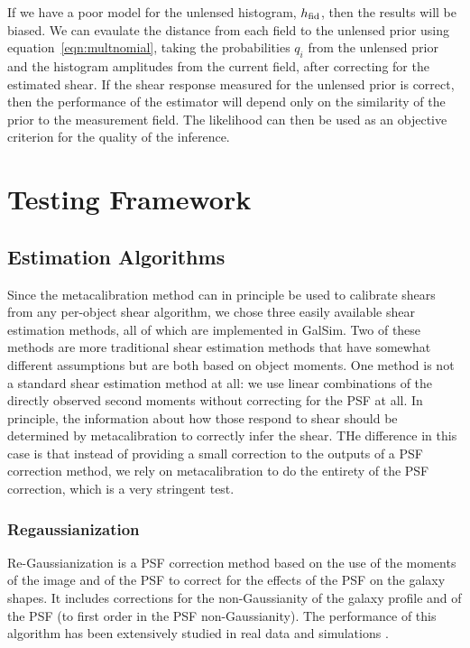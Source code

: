 \documentclass[iop]{emulateapj}
\begin{document}
If we have a poor model for the unlensed histogram, $h_{\rm fid}$, then the results will be biased. We can evaulate the distance from each field to the unlensed prior using equation~\ref{eqn:multnomial}, taking the probabilities $q_i$ from the unlensed prior and the histogram amplitudes from the current field, {after correcting for the estimated shear}. If the shear response measured for the unlensed prior is correct, then the performance of the estimator will depend only on the similarity of the prior to the measurement field. The likelihood can then be used as an objective criterion for the quality of the inference. 



\section{Testing Framework}

\subsection{Estimation Algorithms}

Since the metacalibration method can in principle be used to calibrate shears from any per-object
shear algorithm, we chose three easily available shear estimation methods, all of which are
implemented in GalSim.  Two of these methods are more traditional shear estimation methods that have
somewhat different assumptions but are both based on object moments.  One method is not a standard
shear estimation method at all: we use linear combinations of the directly observed second moments
without correcting for the PSF at all.  In principle, the information about how those respond to
shear should be determined by metacalibration to correctly infer the shear.  THe difference in this
case is that instead of providing a small correction to the outputs of a PSF correction method, we
rely on metacalibration to do the entirety of the PSF correction, which is a very stringent test.

\subsubsection{Regaussianization}

 Re-Gaussianization \citep{2003MNRAS.343..459H} is a PSF correction method based on the use of the
 moments of the image and of the PSF to correct for the effects of the PSF on the galaxy shapes. It
 includes corrections for the non-Gaussianity of the galaxy profile
 \citep{2002AJ....123..583B,2003MNRAS.343..459H} and of the PSF (to first order in the PSF
 non-Gaussianity). The performance of this algorithm has been extensively studied in real data and
 simulations
 \citep[e.g.,][]{2005MNRAS.361.1287M,2012MNRAS.420.1518M,2013MNRAS.432.1544M,2015MNRAS.450.2963M}.
\end{document}

